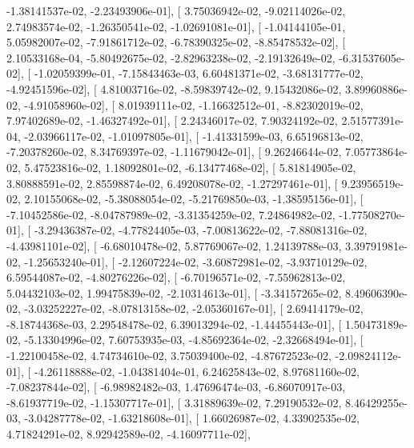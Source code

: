 \documentclass{article}
\begin{document}
         -1.38141537e-02,  -2.23493906e-01],
       [  3.75036942e-02,  -9.02114026e-02,   2.74983574e-02,
         -1.26350541e-02,  -1.02691081e-01],
       [ -1.04144105e-01,   5.05982007e-02,  -7.91861712e-02,
         -6.78390325e-02,  -8.85478532e-02],
       [  2.10533168e-04,  -5.80492675e-02,  -2.82963238e-02,
         -2.19132649e-02,  -6.31537605e-02],
       [ -1.02059399e-01,  -7.15843463e-03,   6.60481371e-02,
         -3.68131777e-02,  -4.92451596e-02],
       [  4.81003716e-02,  -8.59839742e-02,   9.15432086e-02,
          3.89960886e-02,  -4.91058960e-02],
       [  8.01939111e-02,  -1.16632512e-01,  -8.82302019e-02,
          7.97402689e-02,  -1.46327492e-01],
       [  2.24346017e-02,   7.90324192e-02,   2.51577391e-04,
         -2.03966117e-02,  -1.01097805e-01],
       [ -1.41331599e-03,   6.65196813e-02,  -7.20378260e-02,
          8.34769397e-02,  -1.11679042e-01],
       [  9.26246644e-02,   7.05773864e-02,   5.47523816e-02,
          1.18092801e-02,  -6.13477468e-02],
       [  5.81814905e-02,   3.80888591e-02,   2.85598874e-02,
          6.49208078e-02,  -1.27297461e-01],
       [  9.23956519e-02,   2.10155068e-02,  -5.38088054e-02,
         -5.21769850e-03,  -1.38595156e-01],
       [ -7.10452586e-02,  -8.04787989e-02,  -3.31354259e-02,
          7.24864982e-02,  -1.77508270e-01],
       [ -3.29436387e-02,  -4.77824405e-03,  -7.00813622e-02,
         -7.88081316e-02,  -4.43981101e-02],
       [ -6.68010478e-02,   5.87769067e-02,   1.24139788e-03,
          3.39791981e-02,  -1.25653240e-01],
       [ -2.12607224e-02,  -3.60872981e-02,  -3.93710129e-02,
          6.59544087e-02,  -4.80276226e-02],
       [ -6.70196571e-02,  -7.55962813e-02,   5.04432103e-02,
          1.99475839e-02,  -2.10314613e-01],
       [ -3.34157265e-02,   8.49606390e-02,  -3.03252227e-02,
         -8.07813158e-02,  -2.05360167e-01],
       [  2.69414179e-02,  -8.18744368e-03,   2.29548478e-02,
          6.39013294e-02,  -1.44455443e-01],
       [  1.50473189e-02,  -5.13304996e-02,   7.60753935e-03,
         -4.85692364e-02,  -2.32668494e-01],
       [ -1.22100458e-02,   4.74734610e-02,   3.75039400e-02,
         -4.87672523e-02,  -2.09824112e-01],
       [ -4.26118888e-02,  -1.04381404e-01,   6.24625843e-02,
          8.97681160e-02,  -7.08237844e-02],
       [ -6.98982482e-03,   1.47696474e-03,  -6.86070917e-03,
         -8.61937719e-02,  -1.15307717e-01],
       [  3.31889639e-02,   7.29190532e-02,   8.46429255e-03,
         -3.04287778e-02,  -1.63218608e-01],
       [  1.66026987e-02,   4.33902535e-02,   4.71824291e-02,
          8.92942589e-02,  -4.16097711e-02],
\end{document}
